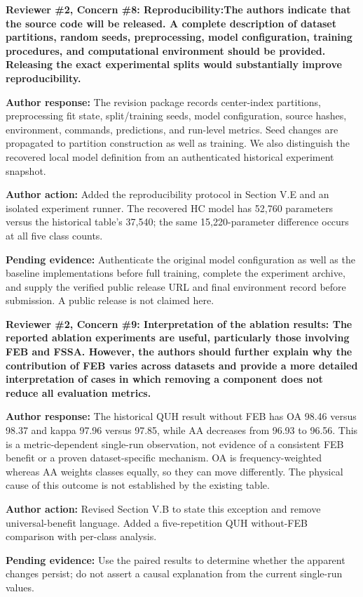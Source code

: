 \documentclass[a4paper,onecolumn,11pt]{IEEEtran}
\newcommand{\pending}[1]{\par\noindent\textcolor{red!70!black}{\textbf{Pending evidence:} #1}\par}
\begin{document}
\vspace{1.5em}
{\color{reviewgreen}\textbf{Reviewer \#2, Concern \#8: Reproducibility:The authors indicate that the source code will be released. A complete description of dataset partitions, random seeds, preprocessing, model configuration, training procedures, and computational environment should be provided. Releasing the exact experimental splits would substantially improve reproducibility. }}

\textbf{Author response:}
The revision package records center-index partitions, preprocessing fit state, split/training seeds, model configuration, source hashes, environment, commands, predictions, and run-level metrics. Seed changes are propagated to partition construction as well as training. We also distinguish the recovered local model definition from an authenticated historical experiment snapshot.

\textbf{Author action:}
Added the reproducibility protocol in Section V.E and an isolated experiment runner. The recovered HC model has 52,760 parameters versus the historical table's 37,540; the same 15,220-parameter difference occurs at all five class counts. \pending{Authenticate the original model configuration as well as the baseline implementations before full training, complete the experiment archive, and supply the verified public release URL and final environment record before submission. A public release is not claimed here.}

\vspace{1.5em}
{\color{reviewgreen}\textbf{Reviewer \#2, Concern \#9: Interpretation of the ablation results: The reported ablation experiments are useful, particularly those involving FEB and FSSA. However, the authors should further explain why the contribution of FEB varies across datasets and provide a more detailed interpretation of cases in which removing a component does not reduce all evaluation metrics. }}

\textbf{Author response:}
The historical QUH result without FEB has OA 98.46 versus 98.37 and kappa 97.96 versus 97.85, while AA decreases from 96.93 to 96.56. This is a metric-dependent single-run observation, not evidence of a consistent FEB benefit or a proven dataset-specific mechanism. OA is frequency-weighted whereas AA weights classes equally, so they can move differently. The physical cause of this outcome is not established by the existing table.

\textbf{Author action:}
Revised Section V.B to state this exception and remove universal-benefit language. Added a five-repetition QUH without-FEB comparison with per-class analysis. \pending{Use the paired results to determine whether the apparent changes persist; do not assert a causal explanation from the current single-run values.}

\vspace{1.5em}
\end{document}
